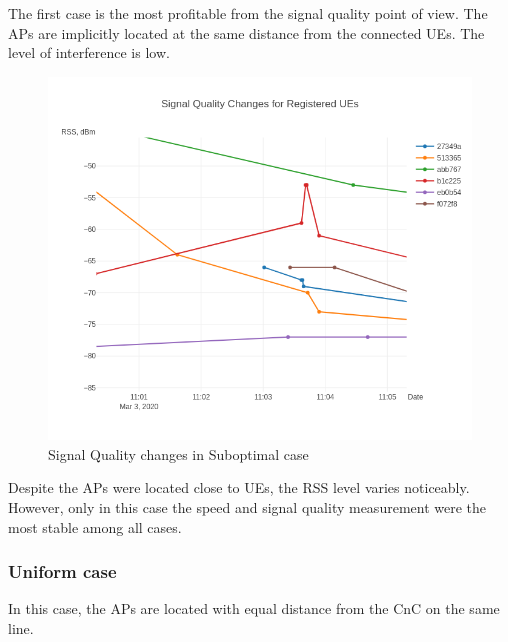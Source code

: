 The first case is the most profitable from the signal quality point of
view. The APs are implicitly located at the same distance from the
connected UEs. The level of interference is low.

\begin{figure}[H]
	\centering
	\includegraphics[width=\linewidth,keepaspectratio]{images/Exp4_Suboptimal.png}
\caption{Signal Quality changes in Suboptimal case}
\end{figure}

Despite the APs were located close to UEs, the RSS level varies noticeably. However, only in this case the speed and signal quality measurement were the most stable among all cases.

\hypertarget{uniform-case}{%
\subsubsection{Uniform case}\label{uniform-case}}

In this case, the APs are located with equal distance from the CnC on the same line.

